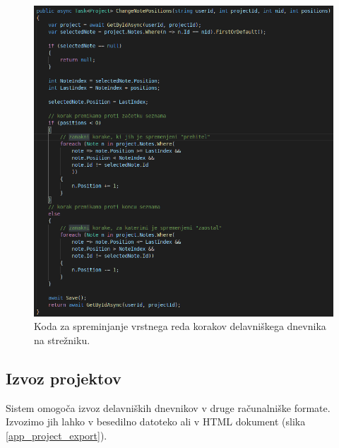 \documentclass[a4paper, 12pt]{book}
\begin{document}
\begin{figure}[H]
\begin{center}
	\includegraphics[width=13.5cm]{api_code_changepos}
\end{center}
	\caption{Koda za spreminjanje vrstnega reda korakov delavniškega dnevnika na strežniku.}
\label{api_code_changepos}
\end{figure}



\subsection{Izvoz projektov}

Sistem omogoča izvoz delavniških dnevnikov v druge računalniške formate.
Izvozimo jih lahko v besedilno datoteko ali v HTML dokument (slika \ref{app_project_export}).
\end{document}
